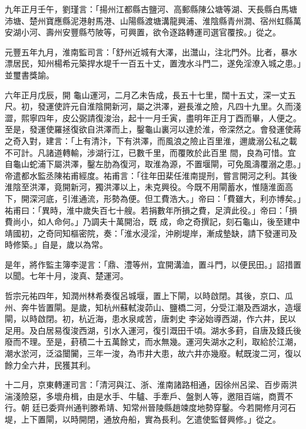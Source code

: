 \begin{pinyinscope}
 九年正月壬午，劉瑾言：「揚州江都縣古鹽河、高郵縣陳公塘等湖、天長縣白馬塘沛塘、楚州寶應縣泥港射馬港、山陽縣渡塘溝龍興浦、淮陰縣青州澗、宿州虹縣萬安湖小河、壽州安豐縣芍陂等，可興置，欲令逐路轉運司選官覆按。」從之。



 元豐五年九月，淮南監司言：「舒州近城有大澤，出灊山，注北門外。比者，暴水漂居民，知州楊希元築捍水堤千一百五十丈，置洩水斗門二，遂免淫潦入城之患。」並璽書獎諭。



 六年正月戊辰，開
 龜山運河，二月乙未告成，長五十七里，闊十五丈，深一丈五尺。初，發運使許元自淮陰開新河，屬之洪澤，避長淮之險，凡四十九里。久而淺澀，熙寧四年，皮公弼請復浚治，起十一月壬寅，盡明年正月丁酉而畢，人便之。至是，發運使羅拯復欲自洪澤而上，鑿龜山裏河以達於淮，帝深然之。會發運使蔣之奇入對，建言：「上有清汴，下有洪澤，而風浪之險止百里淮，邇歲溺公私之載不可計。凡諸道轉輸，涉湖行江，已數千里，而覆敗於此百里
 間，良為可惜。宜自龜山蛇浦下屬洪澤，鑿左肋為復河，取淮為源，不置堰閘，可免風濤覆溺之患。」帝遣都水監丞陳祐甫經度。祐甫言：「往年田棐任淮南提刑，嘗言開河之利。其後淮陰至洪澤，竟開新河，獨洪澤以上，未克興役。今既不用閘蓄水，惟隨淮面高下，開深河底，引淮通流，形勢為便。但工費浩大。」帝曰：「費雖大，利亦博矣。」祐甫曰：「異時，淮中歲失百七十艘。若捐數年所損之費，足濟此役。」帝曰：「損費尚小，如人命何。」乃調夫十萬開治，既
 成，命之奇撰記，刻石龜山，後至建中靖國初，之奇同知樞密院，奏：「淮水浸淫，沖刷堤岸，漸成墊缺，請下發運司及時修築。」自是，歲以為常。



 是年，將作監主簿李湜言：「鼎、澧等州，宜開溝洫，置斗門，以便民田。」詔措置以聞。七年十月，浚真、楚運河。



 哲宗元祐四年，知潤州林希奏復呂城堰，置上下閘，以時啟閉。其後，京口、瓜州、奔牛皆置閘。是歲，知杭州蘇軾浚茆山、鹽橋二河，分受江潮及西湖水，造堰閘，以時啟閉。初，杭近海，患水泉咸苦，唐刺史
 李泌始導西湖，作六井，民以足用。及白居易復浚西湖，引水入運河，復引溉田千頃。湖水多葑，自唐及錢氏後廢而不理。至是，葑積二十五萬餘丈，而水無幾。運河失湖水之利，取給於江潮，潮水淤河，泛溢闤闠，三年一浚，為市井大患，故六井亦幾廢。軾既浚二河，復以餘力全六井，民獲其利。



 十二月，京東轉運司言：「清河與江、浙、淮南諸路相通，因徐州呂梁、百步兩洪湍淺險惡，多壞舟楫，由是水手、牛驢、手牽戶、盤剝人等，邀阻百端，商賈不行。朝
 廷已委齊州通判滕希靖、知常州晉陵縣趙竦度地勢穿鑿。今若開修月河石堤，上下置閘，以時開閉，通放舟船，實為長利。乞遣使監督興修。」從之。




\end{pinyinscope}
